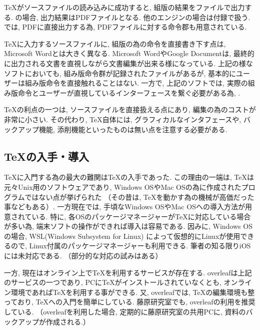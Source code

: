 \documentclass[12pt,xelatex,ja=standard]{bxjsarticle}
\begin{document}
\TeX がソースファイルの読み込みに成功すると,
組版の結果をファイルで出力する.
\XeLaTeX の場合,
出力結果はPDFファイルとなる.
他のエンジンの場合は付録で扱う.
\XeLaTeX では, PDFに直接出力する為,
PDFファイルに対する命令郡も用意されている.

\TeX に入力するソースファイルに,
組版の為の命令を直接書き下す点は,
Microsoft Wordとは大きく異なる.
Microsoft WordやGoogle Documentは,
最終的に出力される文書を直視しながら文書編集が出来る様になっている.
上記の様なソフトにおいても,
組み版命令群が記録されたファイルがあるが,
基本的にユーザーは組み版命令を直接触れることはない.
一方で, 上記のソフトでは,
実際の組み版命令とユーザーが直視しているインターフェースを繋ぐ必要がある為,
.

\TeX の利点の一つは,
ソースファイルを直接扱える点にあり,
編集の為のコストが非常に小さい.
その代わり,
\TeX 自体には, グラフィカルなインタフェースや,
バックアップ機能, 添削機能といったものは無い点を注意する必要がある.

\subsection{\TeX の入手・導入}
\TeX に入門する為の最大の難関は\TeX の入手であった.
この理由の一端は,
\TeX は元々Unix用のソフトウェアであり,
Windows OSやMac OSの為に作成されたプログラムではない点が挙げられた
（その昔は, \TeX を動かす為の機械が高価だった事などもある）.
一方現在では,
手頃なWindows OSやMac OSへの導入方法が用意されている.
特に, 各OSのパッケージマネージャーが\TeX に対応している場合が多い為,
端末ソフトの操作ができれば導入は容易である.
因みに, Windows OSの場合,
WSL(Windows Subsystem for Linux)
によって仮想的にLinuxが使用できるので,
Linux付属のパッケージマネージャーも利用できる.
筆者の知る限りiOSには未対応である.
（部分的な対応の試みはある）

一方, 現在はオンライン上で\TeX を利用するサービスが存在する.
overleafは上記のサービスの一つであり,
PCに\TeX がインストールされていなくとも,
オンライン環境であれば\TeX を利用する事ができる.
又, overleafでは,
\TeX の編集環境も整っており,
\TeX への入門を簡単にしている.
藤原研究室でも,
overleafの利用を推奨している.
（overleafを利用した場合,
定期的に藤原研究室の共用PCに,
資料のバックアップが作成される.）
\end{document}
